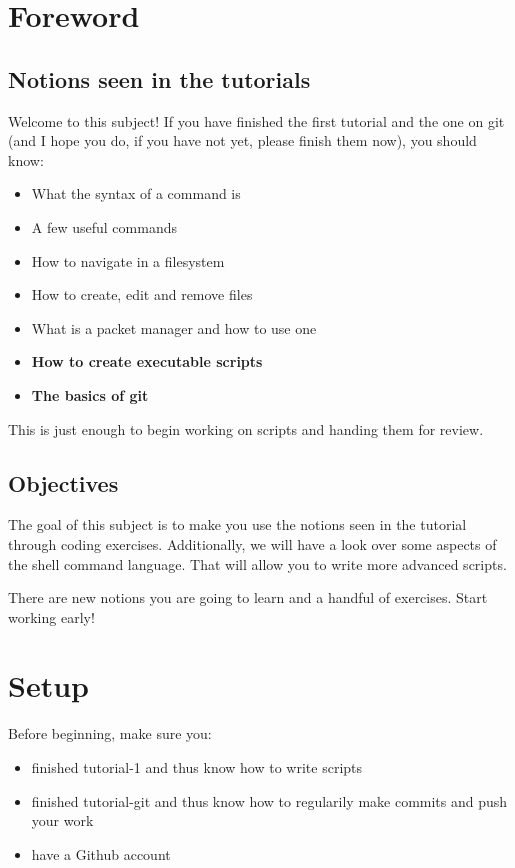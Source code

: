 \documentclass[12pt]{article}
\let\oldhref\href
\renewcommand{\href}[2]{\oldhref{#1}{\bfseries#2}}
\begin{document}
\section{Foreword}
\subsection{Notions seen in the tutorials}

Welcome to this subject! If you have finished the first tutorial and the one on git (and I hope you do, if you have not yet, please finish them now), you should know:

\begin{itemize}
\item What the syntax of a command is
\item A few useful commands
\item How to navigate in a filesystem
\item How to create, edit and remove files
\item What is a packet manager and how to use one 
\item \textbf{How to create executable scripts}
\item \textbf{The basics of git}

\end{itemize}

This is just enough to begin working on scripts and handing them for review.

\subsection{Objectives}

The goal of this subject is to make you use the notions seen in the tutorial through coding exercises.
Additionally, we will have a look over some aspects of the shell command language. That will allow you to write more advanced scripts.

There are new notions you are going to learn and a handful of exercises. Start working early!

\section{Setup}

Before beginning, make sure you:

\begin{itemize}
	\item finished tutorial-1 and thus know how to write scripts
	\item finished tutorial-git and thus know how to regularily make commits and push your work
	\item have a Github account%
\end{itemize}
\end{document}
